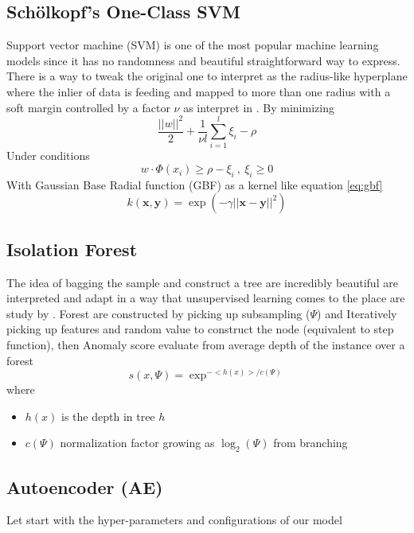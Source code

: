 \subsection{Sch\"{o}lkopf's One-Class SVM}
Support vector machine (SVM) is one of the most popular machine learning models since it has no randomness and beautiful straightforward way to express.
There is a way to tweak the original one to interpret as the radius-like hyperplane where the inlier of data is feeding and mapped to more than one radius with a soft margin controlled by a factor $\nu$ as interpret in \cite{oneclasssvm}.
By minimizing
\begin{equation}
\frac{||w||^2}{2} + \frac{1}{\nu l}\sum_{i=1}^l \xi_i - \rho
\end{equation}
Under conditions
\begin{equation}
    w \cdot \Phi(x_i) \geqslant \rho - \xi_i \ ,\ \xi_i \geqslant 0
\end{equation}
With Gaussian Base Radial function (GBF) as a kernel like equation \ref{eq:gbf}
\begin{equation}\label{eq:gbf}
    k(\mathbf{x}, \mathbf{y}) = \exp(-\gamma||\mathbf{x} - \mathbf{y}||^2)
\end{equation}

\subsection{Isolation Forest}
The idea of bagging the sample and construct a tree are incredibly beautiful are interpreted and adapt in a way that unsupervised learning comes to the place are study by \cite{isolation_forest}.
Forest are constructed by picking up subsampling ($\Psi$) and Iteratively picking up features and random value to construct the node (equivalent to step function), then Anomaly score evaluate from average depth of the instance over a forest
\begin{equation}
    s(x, \Psi) = \exp^{-<h(x)>/c(\Psi)}
\end{equation} 
where
\begin{itemize}
    \item $h(x)$ is the depth in tree $h$
    \item $c(\Psi)$ normalization factor growing as $\log_2(\Psi)$ from branching
\end{itemize}

\subsection{Autoencoder (AE)}
Let start with the hyper-parameters and configurations of our model
